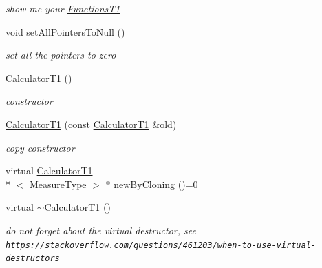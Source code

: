 \begin{DoxyCompactItemize}
\begin{DoxyCompactList}\small\item\em show me your \hyperlink{class_ox_1_1_functions_t1}{Functions\-T1} \end{DoxyCompactList}\item 
\hypertarget{class_ox_1_1_calculator_t1_a11f02c5b0ae3f9b0f8a74044a170ee18}{void \hyperlink{class_ox_1_1_calculator_t1_a11f02c5b0ae3f9b0f8a74044a170ee18}{set\-All\-Pointers\-To\-Null} ()}\label{class_ox_1_1_calculator_t1_a11f02c5b0ae3f9b0f8a74044a170ee18}

\begin{DoxyCompactList}\small\item\em set all the pointers to zero \end{DoxyCompactList}\item 
\hypertarget{class_ox_1_1_calculator_t1_aee286228db734cdd8c6c0686b85fa938}{\hyperlink{class_ox_1_1_calculator_t1_aee286228db734cdd8c6c0686b85fa938}{Calculator\-T1} ()}\label{class_ox_1_1_calculator_t1_aee286228db734cdd8c6c0686b85fa938}

\begin{DoxyCompactList}\small\item\em constructor \end{DoxyCompactList}\item 
\hypertarget{class_ox_1_1_calculator_t1_a125d297d484d10d33b8cbe796b7a60c8}{\hyperlink{class_ox_1_1_calculator_t1_a125d297d484d10d33b8cbe796b7a60c8}{Calculator\-T1} (const \hyperlink{class_ox_1_1_calculator_t1}{Calculator\-T1} \&old)}\label{class_ox_1_1_calculator_t1_a125d297d484d10d33b8cbe796b7a60c8}

\begin{DoxyCompactList}\small\item\em copy constructor \end{DoxyCompactList}\item 
virtual \hyperlink{class_ox_1_1_calculator_t1}{Calculator\-T1}\\*
$<$ Measure\-Type $>$ $\ast$ \hyperlink{class_ox_1_1_calculator_t1_a0db8102b4dad27368667e6ec89c6e4f3}{new\-By\-Cloning} ()=0
\item 
\hypertarget{class_ox_1_1_calculator_t1_af5d360f92d3c1b1c2f4241e528451f2e}{virtual \hyperlink{class_ox_1_1_calculator_t1_af5d360f92d3c1b1c2f4241e528451f2e}{$\sim$\-Calculator\-T1} ()}\label{class_ox_1_1_calculator_t1_af5d360f92d3c1b1c2f4241e528451f2e}

\begin{DoxyCompactList}\small\item\em do not forget about the virtual destructor, see \href{https://stackoverflow.com/questions/461203/when-to-use-virtual-destructors}{\tt https\-://stackoverflow.\-com/questions/461203/when-\/to-\/use-\/virtual-\/destructors} \end{DoxyCompactList}\end{DoxyCompactItemize}
